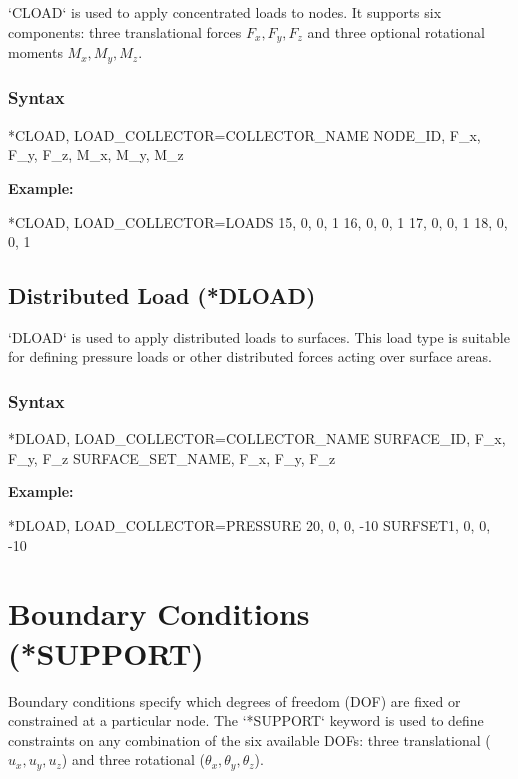 `CLOAD` is used to apply concentrated loads to nodes. It supports six components: three translational forces \( F_x, F_y, F_z \) and three optional rotational moments \( M_x, M_y, M_z \).

\subsubsection{Syntax}

\begin{codeBlock}
*CLOAD, LOAD_COLLECTOR=COLLECTOR_NAME
NODE_ID, F_x, F_y, F_z, M_x, M_y, M_z
\end{codeBlock}

\textbf{Example:}

\begin{codeBlock}
*CLOAD, LOAD_COLLECTOR=LOADS
15, 0, 0, 1
16, 0, 0, 1
17, 0, 0, 1
18, 0, 0, 1
\end{codeBlock}

\subsection{Distributed Load (*DLOAD)}

`DLOAD` is used to apply distributed loads to surfaces. This load type is suitable for defining pressure loads or other distributed forces acting over surface areas.

\subsubsection{Syntax}

\begin{codeBlock}
*DLOAD, LOAD_COLLECTOR=COLLECTOR_NAME
SURFACE_ID, F_x, F_y, F_z
SURFACE_SET_NAME, F_x, F_y, F_z
\end{codeBlock}

\textbf{Example:}
\begin{codeBlock}
*DLOAD, LOAD_COLLECTOR=PRESSURE
20, 0, 0, -10
SURFSET1, 0, 0, -10
\end{codeBlock}

\section{Boundary Conditions (*SUPPORT)}

Boundary conditions specify which degrees of freedom (DOF) are fixed or constrained at a particular node. The `*SUPPORT` keyword is used to define constraints on any combination of the six available DOFs: three translational (\( u_x, u_y, u_z \)) and three rotational (\( \theta_x, \theta_y, \theta_z \)).

